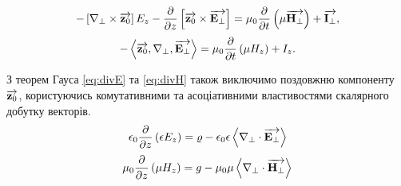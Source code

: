 %
\begin{equation} \label{eq:rotEt} 
- \left[ \nabla_\perp \times \overrightarrow{\mathbf z_0} \right] E_z -
\frac{\partial }{\partial z} \left[ \overrightarrow{\mathbf z_0} \times \overrightarrow{\mathbf E_\perp} \right] = 
\mu_0 \frac{\partial }{\partial t} \left( \mu  \overrightarrow{\mathbf H_\perp} \right) + \overrightarrow{\mathbf I_\perp},
\end{equation}
%
%
\begin{equation} \label{eq:rotEz}
- \left< \overrightarrow{\mathbf z_0} , \nabla_\perp , \overrightarrow{\mathbf E_\perp} \right> =
\mu_0 \frac{\partial }{\partial t} \left(\mu H_z \right) + I_z.
\end{equation}

З теорем Гауса \eqref{eq:divE} та \eqref{eq:divH} також виключимо 
поздовжню компоненту $ \overrightarrow{\mathbf z_0} $, користуючись комутативними та 
асоціативними властивостями скалярного добутку векторів.
%
%
\begin{equation} \label{eq:divEt} 
\epsilon_0 \frac{\partial }{\partial z} \left( \epsilon E_z \right) = 
\varrho - \epsilon_0 \epsilon \left< \nabla_\perp \cdot \overrightarrow{\mathbf E_\perp} \right>
\end{equation}
%
\begin{equation} \label{eq:divHt}
\mu_0 \frac{\partial }{\partial z} \left( \mu H_z \right) = 
g - \mu_0 \mu \left< \nabla_\perp \cdot \overrightarrow{\mathbf H_\perp} \right>
\end{equation}

